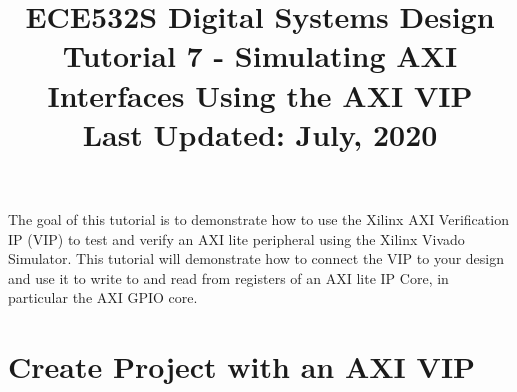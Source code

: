 \documentclass[11pt]{article}
\title{ECE532S Digital Systems Design \\ \vspace{0.4cm}
       \Large Tutorial 7 - Simulating AXI Interfaces Using the AXI VIP \\ \vspace{0.4cm}
       \small Last Updated: July, 2020}
\author{ }
\date{ }
\begin{document}
\maketitle
\vspace{-1cm}

The goal of this tutorial is to demonstrate how to use the Xilinx AXI Verification IP (VIP) to test and verify an AXI lite peripheral using the Xilinx Vivado Simulator. This tutorial will demonstrate how to connect the VIP to your design and use it to write to and read from registers of an AXI lite IP Core, in particular the AXI GPIO core.

\section{Create Project with an AXI VIP}
\label{sec:create_proj}
\end{document}
